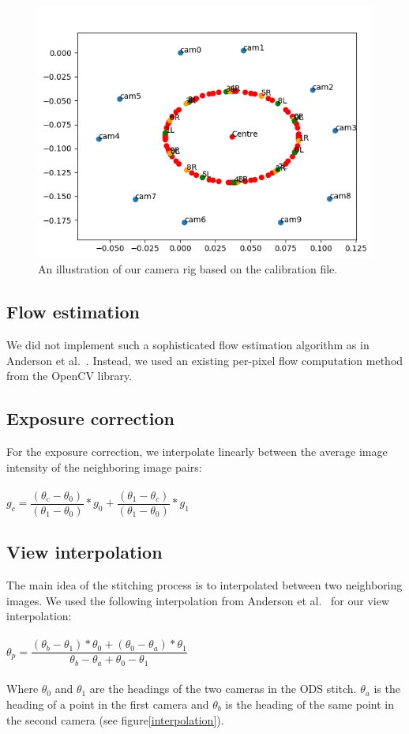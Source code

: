 \documentclass[10pt,twocolumn,letterpaper]{article}
\begin{document}
\begin{figure}[t]
\begin{center}
   \includegraphics[width=0.8\linewidth]{pictures/our_camera_rig.PNG}
\end{center}
   \caption{An illustration of our camera rig based on the calibration file.}
\label{rig}
\end{figure}

\subsection{Flow estimation}
We did not implement such a sophisticated flow estimation algorithm as in Anderson et al.~\cite{jump16}. Instead, we used an existing per-pixel flow computation method from the OpenCV library.

\subsection{Exposure correction}
For the exposure correction, we interpolate linearly between the average image intensity of the neighboring image pairs:\\
\\
$g_{c}=\dfrac{(\theta_{c}-\theta_{0})}{(\theta_1-\theta_{0})}*g_{0} + \dfrac{(\theta_{1}-\theta_{c})}{(\theta_1-\theta_{0})}*g_{1}$
\\
\subsection{View interpolation}
The main idea of the stitching process is to interpolated between two neighboring images.
We used the following interpolation from Anderson et al.~\cite{jump16} for our view interpolation:\\
\\
$\theta_p=\dfrac{(\theta_{b}-\theta_{1})*\theta_{0}+(\theta_{0}-\theta_{a})*\theta_{1}}{\theta_{b}-\theta_{a}+\theta_{0}-\theta_{1}}$
\\
\\
Where $\theta_ {0}$ and $\theta_ {1}$ are the headings of the two cameras in the ODS stitch. $\theta_ {a}$ is the heading of a point in the first camera and $\theta_ {b}$ is the heading of the same point in the second camera (see figure\ref{interpolation}).
\end{document}
